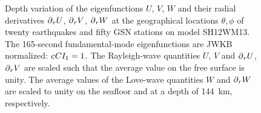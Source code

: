 \begin{figure}[!t]
\begin{center}
\end{center}
\caption[locmodes]{\label{fig:16.locmodes}
Depth variation of the eigenfunctions $U$, $V$, $W$
and their radial derivatives $\mbox{$\partial$}_rU$, $\mbox{$\partial$}_rV$, $\mbox{$\partial$}_rW$
at the geographical locations $\theta,\phi$ of twenty
earthquakes and fifty GSN stations on model SH12WM13.
The 165-second fundamental-mode eigenfunctions are
JWKB normalized: $c\hspace{0.2 mm}CI_1=1$.
The Rayleigh-wave quantities $U$, $V$ and $\mbox{$\partial$}_rU$,
$\mbox{$\partial$}_rV$ are scaled such that the average value on
the free surface is unity.  The average values
of the Love-wave quantities $W$ and $\mbox{$\partial$}_rW$ are
scaled to unity on the seafloor and at a depth
of 144~km, respectively.}
\end{figure}

